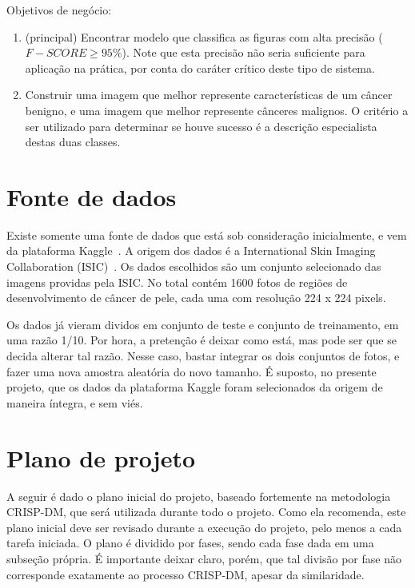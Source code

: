 \documentclass[12pt,oneside,a4paper]{article}
\begin{document}
Objetivos de negócio:
\begin{enumerate}
    \item (principal) Encontrar modelo que classifica as figuras com alta precisão ($F-SCORE \geq 95\%$). Note que esta precisão não seria suficiente para aplicação na prática, por conta do caráter crítico deste tipo de sistema.
    
    \item Construir uma imagem que melhor represente características de um câncer benigno, e uma imagem que melhor represente cânceres malignos. O critério a ser utilizado para determinar se houve sucesso é a descrição especialista destas duas classes.
\end{enumerate}

\section{Fonte de dados}

Existe somente uma fonte de dados que está sob consideração inicialmente, e vem da plataforma Kaggle~\cite{Dataset}. A origem dos dados é a International Skin Imaging Collaboration (ISIC)~\cite{ISIC_HISTORY}. Os dados escolhidos são um conjunto selecionado das imagens providas pela ISIC. No total contém 1600 fotos de regiões de desenvolvimento de câncer de pele, cada uma com resolução 224 x 224 pixels.

Os dados já vieram dividos em conjunto de teste e conjunto de treinamento, em uma razão 1/10. Por hora, a pretenção é deixar como está, mas pode ser que se decida alterar tal razão. Nesse caso, bastar integrar os dois conjuntos de fotos, e fazer uma nova amostra aleatória do novo tamanho. É suposto, no presente projeto, que os dados da plataforma Kaggle foram selecionados da origem de maneira íntegra, e sem viés.

\section{Plano de projeto}

A seguir é dado o plano inicial do projeto, baseado fortemente na metodologia CRISP-DM, que será utilizada durante todo o projeto. Como ela recomenda, este plano inicial deve ser revisado durante a execução do projeto, pelo menos a cada tarefa iniciada. O plano é dividido por fases, sendo cada fase dada em uma subseção própria. É importante deixar claro, porém, que tal divisão por fase não corresponde exatamente ao processo CRISP-DM, apesar da similaridade.
\end{document}
